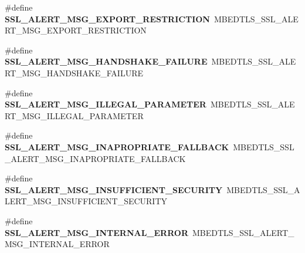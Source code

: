 \begin{DoxyCompactItemize}
\item 
\mbox{\label{compat-1_83_8h_a243347f3447592161fd255351344cfbc}} 
\#define {\bfseries S\+S\+L\+\_\+\+A\+L\+E\+R\+T\+\_\+\+M\+S\+G\+\_\+\+E\+X\+P\+O\+R\+T\+\_\+\+R\+E\+S\+T\+R\+I\+C\+T\+I\+ON}~M\+B\+E\+D\+T\+L\+S\+\_\+\+S\+S\+L\+\_\+\+A\+L\+E\+R\+T\+\_\+\+M\+S\+G\+\_\+\+E\+X\+P\+O\+R\+T\+\_\+\+R\+E\+S\+T\+R\+I\+C\+T\+I\+ON
\item 
\mbox{\label{compat-1_83_8h_a21e00498ea9a069ec7f182a87ec8b177}} 
\#define {\bfseries S\+S\+L\+\_\+\+A\+L\+E\+R\+T\+\_\+\+M\+S\+G\+\_\+\+H\+A\+N\+D\+S\+H\+A\+K\+E\+\_\+\+F\+A\+I\+L\+U\+RE}~M\+B\+E\+D\+T\+L\+S\+\_\+\+S\+S\+L\+\_\+\+A\+L\+E\+R\+T\+\_\+\+M\+S\+G\+\_\+\+H\+A\+N\+D\+S\+H\+A\+K\+E\+\_\+\+F\+A\+I\+L\+U\+RE
\item 
\mbox{\label{compat-1_83_8h_ad93db03390f910032467790dab2593fe}} 
\#define {\bfseries S\+S\+L\+\_\+\+A\+L\+E\+R\+T\+\_\+\+M\+S\+G\+\_\+\+I\+L\+L\+E\+G\+A\+L\+\_\+\+P\+A\+R\+A\+M\+E\+T\+ER}~M\+B\+E\+D\+T\+L\+S\+\_\+\+S\+S\+L\+\_\+\+A\+L\+E\+R\+T\+\_\+\+M\+S\+G\+\_\+\+I\+L\+L\+E\+G\+A\+L\+\_\+\+P\+A\+R\+A\+M\+E\+T\+ER
\item 
\mbox{\label{compat-1_83_8h_a5e6540504a41cf8b326240f7d2295038}} 
\#define {\bfseries S\+S\+L\+\_\+\+A\+L\+E\+R\+T\+\_\+\+M\+S\+G\+\_\+\+I\+N\+A\+P\+R\+O\+P\+R\+I\+A\+T\+E\+\_\+\+F\+A\+L\+L\+B\+A\+CK}~M\+B\+E\+D\+T\+L\+S\+\_\+\+S\+S\+L\+\_\+\+A\+L\+E\+R\+T\+\_\+\+M\+S\+G\+\_\+\+I\+N\+A\+P\+R\+O\+P\+R\+I\+A\+T\+E\+\_\+\+F\+A\+L\+L\+B\+A\+CK
\item 
\mbox{\label{compat-1_83_8h_a5ee5ef076802f9d80a86676805daddeb}} 
\#define {\bfseries S\+S\+L\+\_\+\+A\+L\+E\+R\+T\+\_\+\+M\+S\+G\+\_\+\+I\+N\+S\+U\+F\+F\+I\+C\+I\+E\+N\+T\+\_\+\+S\+E\+C\+U\+R\+I\+TY}~M\+B\+E\+D\+T\+L\+S\+\_\+\+S\+S\+L\+\_\+\+A\+L\+E\+R\+T\+\_\+\+M\+S\+G\+\_\+\+I\+N\+S\+U\+F\+F\+I\+C\+I\+E\+N\+T\+\_\+\+S\+E\+C\+U\+R\+I\+TY
\item 
\mbox{\label{compat-1_83_8h_ae62074a176d711811f00e9a4a6a6596b}} 
\#define {\bfseries S\+S\+L\+\_\+\+A\+L\+E\+R\+T\+\_\+\+M\+S\+G\+\_\+\+I\+N\+T\+E\+R\+N\+A\+L\+\_\+\+E\+R\+R\+OR}~M\+B\+E\+D\+T\+L\+S\+\_\+\+S\+S\+L\+\_\+\+A\+L\+E\+R\+T\+\_\+\+M\+S\+G\+\_\+\+I\+N\+T\+E\+R\+N\+A\+L\+\_\+\+E\+R\+R\+OR
\item 

\end{DoxyCompactItemize}
